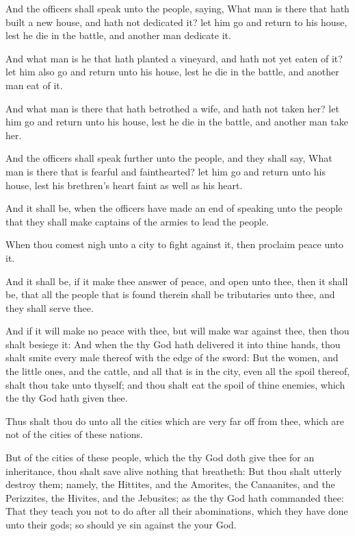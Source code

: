 \verse And the officers shall speak unto the people, saying, What man is there that hath built a new house, and hath not dedicated it? let him go and return to his house, lest he die in the battle, and another man dedicate it.

\verse And what man is he that hath planted a vineyard, and hath not yet eaten of it? let him also go and return unto his house, lest he die in the battle, and another man eat of it.

\verse And what man is there that hath betrothed a wife, and hath not taken her? let him go and return unto his house, lest he die in the battle, and another man take her.

\verse And the officers shall speak further unto the people, and they shall say, What man is there that is fearful and fainthearted? let him go and return unto his house, lest his brethren's heart faint as well as his heart.

\verse And it shall be, when the officers have made an end of speaking unto the people that they shall make captains of the armies to lead the people.

\verse When thou comest nigh unto a city to fight against it, then proclaim peace unto it.

\verse And it shall be, if it make thee answer of peace, and open unto thee, then it shall be, that all the people that is found therein shall be tributaries unto thee, and they shall serve thee.

\verse And if it will make no peace with thee, but will make war against thee, then thou shalt besiege it: \verse And when the \LORD thy God hath delivered it into thine hands, thou shalt smite every male thereof with the edge of the sword: \verse But the women, and the little ones, and the cattle, and all that is in the city, even all the spoil thereof, shalt thou take unto thyself; and thou shalt eat the spoil of thine enemies, which the \LORD thy God hath given thee.

\verse Thus shalt thou do unto all the cities which are very far off from thee, which are not of the cities of these nations.

\verse But of the cities of these people, which the \LORD thy God doth give thee for an inheritance, thou shalt save alive nothing that breatheth: \verse But thou shalt utterly destroy them; namely, the Hittites, and the Amorites, the Canaanites, and the Perizzites, the Hivites, and the Jebusites; as the \LORD thy God hath commanded thee: \verse That they teach you not to do after all their abominations, which they have done unto their gods; so should ye sin against the \LORD your God.


